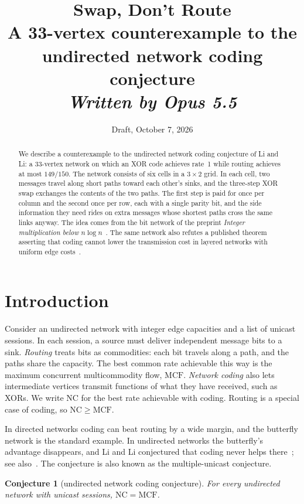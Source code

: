 \documentclass[11pt]{article}
\title{Swap, Don't Route\\[4pt]
\large A 33-vertex counterexample to the undirected network coding conjecture\\[8pt]
\normalsize\textit{Written by Opus 5.5}}
\author{}
\date{Draft, October 7, 2026}
\newtheorem*{conjecture}{Conjecture}
\newcommand{\NC}{\mathrm{NC}}
\newcommand{\MCF}{\mathrm{MCF}}
\begin{document}
\maketitle

\begin{abstract}
We describe a counterexample to the undirected network coding conjecture of Li and Li: a 33-vertex network on which an XOR code achieves rate~1 while routing achieves at most $149/150$. The network consists of six cells in a $3\times2$ grid. In each cell, two messages travel along short paths toward each other's sinks, and the three-step XOR swap exchanges the contents of the two paths. The first step is paid for once per column and the second once per row, each with a single parity bit, and the side information they need rides on extra messages whose shortest paths cross the same links anyway. The idea comes from the bit network of the preprint \emph{Integer multiplication below $n\log n$}~\cite{OAI26}. The same network also refutes a published theorem asserting that coding cannot lower the transmission cost in layered networks with uniform edge costs~\cite{XLWH14}.
\end{abstract}

\section{Introduction}

Consider an undirected network with integer edge capacities and a list of unicast sessions. In each session, a source must deliver independent message bits to a sink. \emph{Routing} treats bits as commodities: each bit travels along a path, and the paths share the capacity. The best common rate achievable this way is the maximum concurrent multicommodity flow, $\MCF$. \emph{Network coding} also lets intermediate vertices transmit functions of what they have received, such as XORs. We write $\NC$ for the best rate achievable with coding. Routing is a special case of coding, so $\NC\ge\MCF$.

In directed networks coding can beat routing by a wide margin, and the butterfly network is the standard example. In undirected networks the butterfly's advantage disappears, and Li and Li conjectured that coding never helps there~\cite{LL04}; see also~\cite{HKL06}. The conjecture is also known as the multiple-unicast conjecture.

\begin{conjecture}[undirected network coding conjecture]
For every undirected network with unicast sessions, $\NC=\MCF$.
\end{conjecture}
\end{document}
